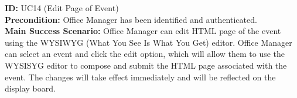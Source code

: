\textbf{ID:} UC14 (Edit Page of Event) \\
\textbf{Precondition:} Office Manager has been identified and authenticated. \\
\textbf{Main Success Scenario:} Office Manager can edit HTML page of the event using the WYSIWYG (What You See Is What You Get) editor. Office Manager can select an event and click the edit option, which will allow them to use the WYSISYG editor to compose and submit the HTML page associated with the event. The changes will take effect immediately and will be reflected on the display board. \\